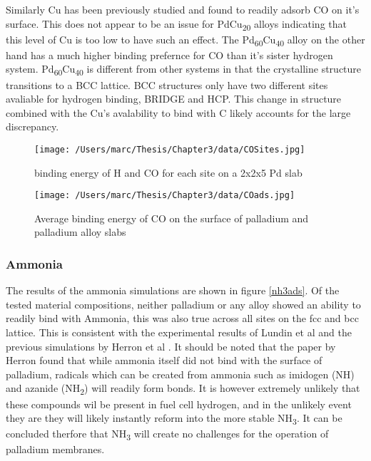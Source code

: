 Similarly Cu has been previously studied and found to readily adsorb CO on it's surface. \cite{doi:10.1021/la950167j} This does not appear to be an issue for PdCu\textsubscript{20} alloys indicating that this level of Cu is too low to have such an effect. The Pd\textsubscript{60}Cu\textsubscript{40} alloy on the other hand has a much higher binding prefernce for CO than it's sister hydrogen system. Pd\textsubscript{60}Cu\textsubscript{40} is different from other systems in that the crystalline structure transitions to a BCC lattice. \cite{She2014} BCC structures only have two different sites avaliable for hydrogen binding, BRIDGE and HCP. \cite{C3CP44367A} This change in structure combined with the Cu's avalability to bind with C likely accounts for the large discrepancy. 

\begin{figure}
  \centering
  \texttt{[image: /Users/marc/Thesis/Chapter3/data/COSites.jpg]}
  \caption{binding energy of H and CO for each site on a 2x2x5 Pd slab}
  \label{COsite}
\end{figure}


\begin{landscape}
    \begin{figure}
        \centering
        \texttt{[image: /Users/marc/Thesis/Chapter3/data/COads.jpg]}
        \caption{Average binding energy of CO on the surface of palladium and palladium alloy slabs}
        \label{coads}
      \end{figure}
    
    \end{landscape}
\subsubsection{Ammonia}
The results of the ammonia simulations are shown in figure \ref{nh3ads}. Of the tested material compositions, neither palladium or any alloy showed an ability to readily bind with Ammonia, this was also true across all sites on the fcc and bcc lattice. This is consistent with the experimental results of Lundin et al \cite{Lundin2016} and the previous simulations by Herron et al \cite{HERRON20121670}. It should be noted that the paper by Herron \cite{HERRON20121670} found that while ammonia itself did not bind with the surface of palladium, radicals which can be created from ammonia such as imidogen (NH) and azanide (NH\textsubscript{2}) will readily form bonds. It is however extremely unlikely that these compounds wil be present in fuel cell hydrogen, and in the unlikely event they are they will likely instantly reform into the more stable NH\textsubscript{3}. It can be concluded therfore that NH\textsubscript{3} will create no challenges for the operation of palladium membranes. 


